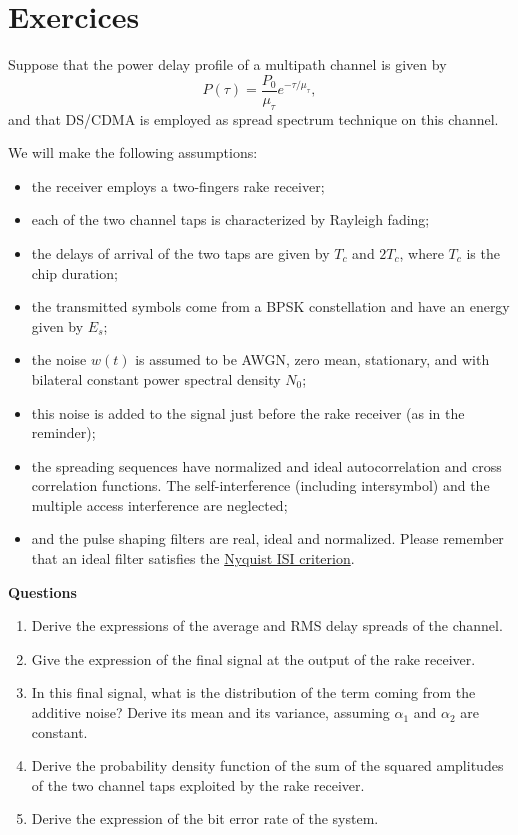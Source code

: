 \documentclass [a4paper, 11pt] {article}
\begin{document}
    \part*{Exercices}

    \begin{exercise}{1}

Suppose that the power delay profile of a multipath channel is given by
\begin{equation}
    P(\tau) = \frac{P_0}{\mu_\tau}e^{-\tau/\mu_\tau},
\end{equation}
and that DS/CDMA is employed as spread spectrum technique on this channel.

We will make the following assumptions:

\begin{itemize}
    \item the receiver employs a two-fingers rake receiver;
    \item each of the two channel taps is characterized by Rayleigh fading;
    \item the delays of arrival of the two taps are given by $T_c$ and $2T_c$, where $T_c$ is the chip duration;
    \item the transmitted symbols come from a BPSK constellation and have an energy given by $E_s$;
    \item the noise $w(t)$ is assumed to be AWGN, zero mean, stationary, and with bilateral constant power spectral density $N_0$;
    \item this noise is added to the signal just before the rake receiver (as in the reminder);
    \item the spreading sequences have normalized and ideal autocorrelation and cross correlation functions. The self-interference (including intersymbol) and the multiple access interference are neglected;
    \item and the pulse shaping filters are real, ideal and normalized. Please remember that an ideal filter satisfies the \href{https://en.wikipedia.org/wiki/Nyquist_ISI_criterion}{Nyquist ISI criterion}.
\end{itemize}


{\normalfont \textbf{Questions}}

\begin{enumerate}
    \item Derive the expressions of the average and RMS delay spreads of the channel.
    \item Give the expression of the final signal at the output of the rake receiver.
    \item In this final signal, what is the distribution of the term coming from the additive noise? Derive its mean and its variance, assuming $\alpha_1$ and $\alpha_2$ are constant.
    \item Derive the probability density function of the sum of the squared amplitudes of the two channel taps exploited by the rake receiver.
    \item Derive the expression of the bit error rate of the system.
\end{enumerate}


\end{exercise}
\end{document}
